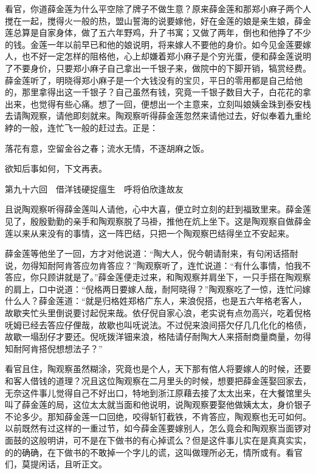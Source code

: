 \documentclass[12pt,UTF8]{ctexbook}
\begin{document}
{{{看官，你道薛金莲为什么平空除了牌子不做生意？原来薛金莲和那郑小麻子两个人搅在一起，搅得火一般的热，盟山誓海的说要嫁他，好在金莲的娘是亲生娘，薛金莲总算是自家身体，做了五六年野鸡，升了书寓；又做了两年，倒也和他挣了不少的钱。金莲一年以前早已和他的娘说明，将来嫁人不要他的身价。如今见金莲要嫁人，也不好一定怎样的阻格他，心上却嫌着郑小麻子是个穷光蛋，便和薛金莲说明了不要身价，只要郑小麻子自己拿出一千银子来，做院中的下脚开销，犒赏经费。薛金莲听了，明晓得郑小麻子是一个大钱没有的宝贝，平日的零用都是自己给他的，那里拿得出这一千银子？自己虽然有钱，究竟一千银子数目大子，白花花的拿出来，也觉得有些心痛。想了一回，便想出一个主意来，立刻叫娘姨金珠到泰安栈去请陶观察，请他即刻就来。陶观察听得薛金莲忽然来请他过去，好似奉着九重纶綍的一般，连忙飞一般的赶过去。正是：

落花有意，空留金谷之春；流水无情，不逐胡麻之饭。

欲知后事如何，下文再表。





第九十六回　借洋钱硬捉瘟生　呼将伯欣逢故友





且说陶观察听得薛金莲叫人请他，心中大喜，便立时立刻的赶到福致里来。薛金莲见了，殷殷勤勤的亲手和陶观察脱了马褂，推他在炕上坐下。这是陶观察自做薛金莲以来从来没有的事情，这一阵巴结，只把一个陶观察巴结得坐立不安起来。

薛金莲等他坐了一回，方才对他说道：“陶大人，倪今朝请耐来，有句闲话搭耐说，勿得知耐阿肯答应勿肯答应？”陶观察听了，连忙说道：“有什么事情，怕我不答应，你只顾讲就是了。”薛金莲便走过来，和陶观察并肩坐下，一只手搭在陶观察的肩上，口中说道：“倪格两日要嫁人哉，耐阿晓得？”陶观察吃了一惊，连忙问嫁什么人？薛金莲道：“就是归格姓郑格广东人，来浪倪搭，也是五六年格老客人，故歇夹忙头里倒说要讨起倪来哉。依仔倪自家心浪，老实说有点勿高兴，吃着倪格呒姆已经去答应仔俚哉，故歇也叫呒说法。不过倪来浪间搭欠仔几几化化的格债，故歇一塌刮仔才要还。倪呒拨洋钿来浪，格陆请仔耐陶大人来搭耐商量商量，勿得知耐阿肯搭倪想想法子？”

看官且住，陶观察虽然糊涂，究竟也是个人，天下那有倌人将要嫁人的时候，还要和客人借钱的道理？况且这位陶观察在二月里头的时候，想要把薛金莲娶回家去，无奈这件事儿觉得自己不好出口，特地到浙江原藉去接了太太出来，在大餐馆里头叫了薛金莲的局，这位太太就当面和他说明，说陶观察要娶他做姨太太，身价银子不论多少。那知薛金莲一口回绝，咬得斩钉截铁，不肯答应，陶观察也无可如何。以前既然有过这样的一重过节，如今薛金莲要嫁别人，怎么竟会和陶观察当面锣对面鼓的这般明讲，可不是在下做书的有心掉谎么？但是这件事儿实在是真真实实，的的确确，在下做书的不敢掉一个字儿的谎，这叫做理所必无，情所或有。看官们，莫提闲话，且听正文。

}}}
\end{document}
